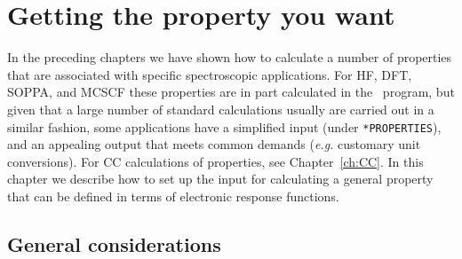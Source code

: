 \chapter{Getting the property you want}\label{ch:rspchap}


In the preceding chapters we have shown how to calculate a number of
properties that are associated with specific spectroscopic applications.
For HF, DFT, SOPPA, and MCSCF these properties are in part
calculated in the \resp\ program, but given that a large number of
standard calculations usually are carried out in a similar fashion, some
applications have a simplified input (under {\tt **PROPERTIES}), 
and an appealing output that meets common demands 
({\it e.g.\/} customary unit conversions).
For CC calculations of properties, see Chapter~\ref{ch:CC}.
In this chapter we
describe how to set up the input for calculating a general property that
can be defined in terms of electronic response functions. 

\section{General considerations}
\label{sec:rspgen}

\begin{center}
\end{center}

